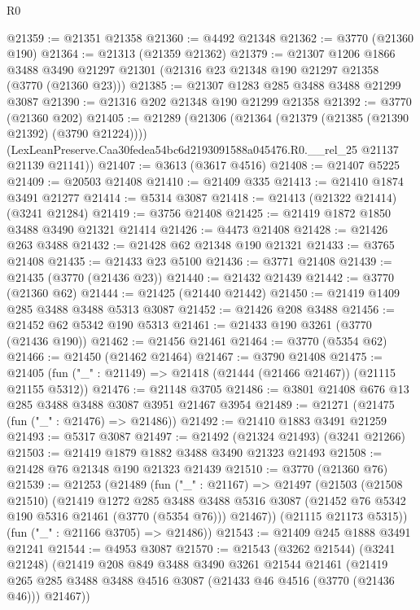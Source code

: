 \begin{lexlean}{R0}
\begin{coremodule}
@21359 := @21351 @21358
@21360 := @4492 @21348
@21362 := @3770 (@21360 @190)
@21364 := @21313 (@21359 @21362)
@21379 := @21307
    @1206
    @1866
    @3488
    @3490
    @21297
    @21301
    (@21316 @23 @21348 @190 @21297 @21358 (@3770 (@21360 @23)))
@21385 := @21307 @1283 @285 @3488 @3488 @21299 @3087
@21390 := @21316 @202 @21348 @190 @21299 @21358
@21392 := @3770 (@21360 @202)
@21405 := @21289
    (@21306
      (@21364 (@21379 (@21385 (@21390 @21392) (@3790 @21224))))
      (LexLeanPreserve.Caa30fedea54bc6d2193091588a045476.R0.__rel_25 @21137 @21139 @21141))
@21407 := @3613 (@3617 @4516)
@21408 := @21407 @5225
@21409 := @20503 @21408
@21410 := @21409 @335
@21413 := @21410 @1874 @3491 @21277
@21414 := @5314 @3087
@21418 := @21413 (@21322 @21414) (@3241 @21284)
@21419 := @3756 @21408
@21425 := @21419 @1872 @1850 @3488 @3490 @21321 @21414
@21426 := @4473 @21408
@21428 := @21426 @263 @3488
@21432 := @21428 @62 @21348 @190 @21321
@21433 := @3765 @21408
@21435 := @21433 @23 @5100
@21436 := @3771 @21408
@21439 := @21435 (@3770 (@21436 @23))
@21440 := @21432 @21439
@21442 := @3770 (@21360 @62)
@21444 := @21425 (@21440 @21442)
@21450 := @21419 @1409 @285 @3488 @3488 @5313 @3087
@21452 := @21426 @208 @3488
@21456 := @21452 @62 @5342 @190 @5313
@21461 := @21433 @190 @3261 (@3770 (@21436 @190))
@21462 := @21456 @21461
@21464 := @3770 (@5354 @62)
@21466 := @21450 (@21462 @21464)
@21467 := @3790 @21408
@21475 := @21405 (fun ("_" : @21149) => @21418 (@21444 (@21466 @21467)) (@21115 @21155 @5312))
@21476 := @21148 @3705
@21486 := @3801 @21408 @676 @13 @285 @3488 @3488 @3087 @3951 @21467 @3954
@21489 := @21271 (@21475 (fun ("_" : @21476) => @21486))
@21492 := @21410 @1883 @3491 @21259
@21493 := @5317 @3087
@21497 := @21492 (@21324 @21493) (@3241 @21266)
@21503 := @21419 @1879 @1882 @3488 @3490 @21323 @21493
@21508 := @21428 @76 @21348 @190 @21323 @21439
@21510 := @3770 (@21360 @76)
@21539 := @21253
    (@21489
      (fun ("_" : @21167) =>
      @21497
        (@21503
          (@21508 @21510)
          (@21419
            @1272
            @285
            @3488
            @3488
            @5316
            @3087
            (@21452 @76 @5342 @190 @5316 @21461 (@3770 (@5354 @76)))
            @21467))
        (@21115 @21173 @5315))
      (fun ("_" : @21166 @3705) => @21486))
@21543 := @21409 @245 @1888 @3491 @21241
@21544 := @4953 @3087
@21570 := @21543
    (@3262 @21544)
    (@3241 @21248)
    (@21419
      @208
      @849
      @3488
      @3490
      @3261
      @21544
      @21461
      (@21419 @265 @285 @3488 @3488 @4516 @3087 (@21433 @46 @4516 (@3770 (@21436 @46))) @21467))

\end{coremodule}
\end{lexlean}
